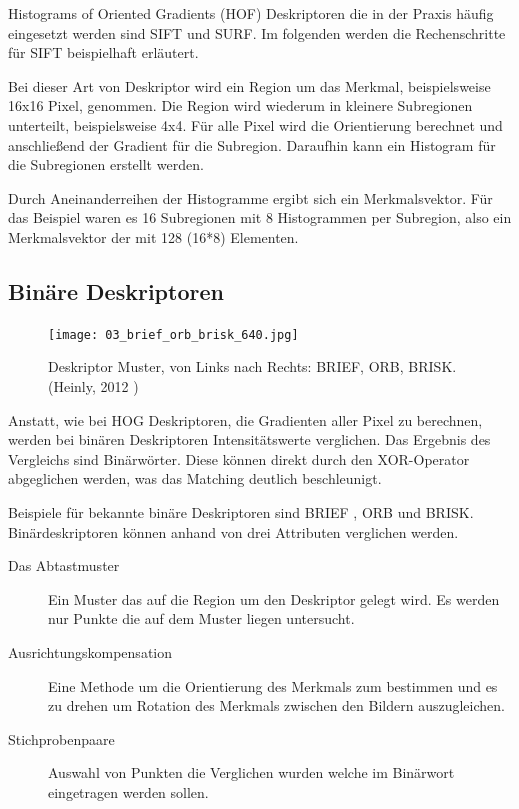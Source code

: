 Histograms of Oriented Gradients (HOF) Deskriptoren die in der Praxis häufig eingesetzt werden sind SIFT \cite{SIFT} und SURF\cite{SURF}. Im folgenden werden die Rechenschritte für SIFT beispielhaft erläutert.
\newline

Bei dieser Art von Deskriptor wird ein Region um das Merkmal, beispielsweise 16x16 Pixel, genommen. Die Region wird wiederum in kleinere Subregionen unterteilt, beispielsweise 4x4. Für alle Pixel wird die Orientierung berechnet und anschlie{\ss}end der Gradient für die Subregion. Daraufhin kann ein Histogram für die Subregionen erstellt werden.

Durch Aneinanderreihen der Histogramme ergibt sich ein Merkmalsvektor. Für das Beispiel waren es 16 Subregionen mit 8 Histogrammen per Subregion, also ein Merkmalsvektor der mit 128 (16*8) Elementen. 

\subsection{Binäre Deskriptoren}

\begin{figure}[!ht]
  \centering
  \texttt{[image: 03\_brief\_orb\_brisk\_640.jpg]}
  \caption[Muster binärer Deskriptoren]{Deskriptor Muster, von Links nach Rechts: BRIEF, ORB, BRISK. (Heinly, 2012 \cite{binDesc})}
\end{figure}

Anstatt, wie bei HOG Deskriptoren, die Gradienten aller Pixel zu berechnen, werden bei binären Deskriptoren Intensitätswerte verglichen. Das Ergebnis des Vergleichs sind Binärwörter. Diese können direkt durch den XOR-Operator abgeglichen werden, was das Matching deutlich beschleunigt. 

Beispiele für bekannte binäre Deskriptoren sind BRIEF \cite{BRIEF}, ORB \cite{ORB} und BRISK\cite{BRISK}. Binärdeskriptoren können anhand von drei Attributen verglichen werden.

\begin{description}
  \item[Das Abtastmuster] Ein Muster das auf die Region um den Deskriptor gelegt wird. Es werden nur Punkte die auf dem Muster liegen untersucht.
  \item[Ausrichtungskompensation] Eine Methode um die Orientierung des Merkmals zum bestimmen und es zu drehen um Rotation des Merkmals zwischen den Bildern auszugleichen.
  \item[Stichprobenpaare] Auswahl von Punkten die Verglichen wurden welche im Binärwort eingetragen werden sollen. 
\end{description}

